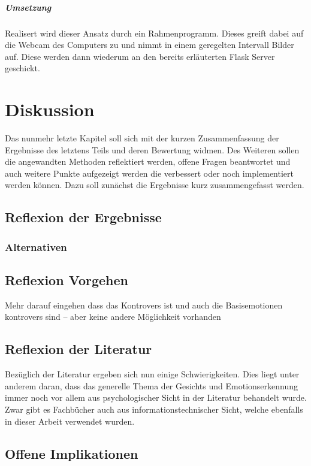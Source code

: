 \documentclass[12pt, a4paper]{scrbook}
\begin{document}
\paragraph{Umsetzung}
Realisert wird dieser Ansatz durch ein Rahmenprogramm. Dieses greift dabei auf die Webcam des Computers zu und nimmt in einem geregelten Intervall Bilder auf. Diese werden dann wiederum an den bereits erläuterten Flask Server geschickt.
\let\cleardoublepage\relax
\chapter{Diskussion}
Das nunmehr letzte Kapitel soll sich mit der kurzen Zusammenfassung der Ergebnisse des letztens Teils und deren Bewertung widmen. 
Des Weiteren sollen die angewandten Methoden reflektiert werden,
offene Fragen beantwortet und auch weitere Punkte aufgezeigt werden die verbessert oder noch implementiert werden können. Dazu soll zunächst die Ergebnisse kurz zusammengefasst werden.

\section{Reflexion der Ergebnisse}

\subsection{Alternativen}

\section{Reflexion Vorgehen}
Mehr darauf eingehen dass das Kontrovers ist und auch die Basisemotionen kontrovers sind --  aber keine andere Möglichkeit vorhanden 

\section{Reflexion der Literatur}
Bezüglich der Literatur ergeben sich nun einige Schwierigkeiten. Dies liegt unter anderem daran, dass das generelle Thema der Gesichts und Emotionserkennung immer noch vor allem aus
psychologischer Sicht in der Literatur behandelt wurde. Zwar gibt es Fachbücher auch aus informationstechnischer Sicht, welche ebenfalls in dieser Arbeit verwendet wurden.

\section{Offene Implikationen}
\end{document}
